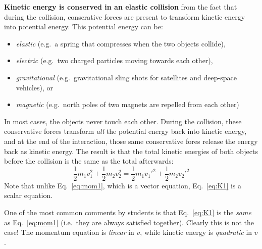 \textbf{Kinetic energy is conserved in an elastic collision} from the fact that
during the collision, conserative forces are present to transform kinetic
energy into  potential energy. This potential energy can be:
\begin{itemize}[itemsep=6pt]
\item\emph{elastic} (e.g.\ a spring that compresses when the two objects
  collide),
\item\emph{electric} (e.g.\ two charged particles moving towards each other),
\item\emph{gravitational} (e.g.\ gravitational sling shots for satellites and
  deep-space vehicles), or
\item\emph{magnetic} (e.g.\ north poles of two magnets are repelled from each
  other)
\end{itemize}
In most cases, the objects never touch each other. During the collision, these
conservative forces transform \emph{all} the potential energy back into kinetic
energy, and at the end of the interaction, those same conservative fores
release the energy back as kinetic energy. The result is that the total kinetic
energies of both objects before the collision is the same as the total
afterwards:
\begin{equation}
  \frac12m_1v_1^2 + \frac12m_2v_2^2 = \frac12m_1v_1'^2+\frac12 m_2v_2'^2
  \label{eq:K1}
\end{equation}
Note that unlike Eq.~\ref{eq:mom1}, which is a vector equation, Eq.~\ref{eq:K1}
is a scalar equation.
\begin{remark}
  One of the most common comments by students is that Eq.~\ref{eq:K1} is the
  \emph{same} as Eq.~\ref{eq:mom1} (i.e.\ they are always satisfied together).
  Clearly this is not the case! The momentum equation is \emph{linear} in $v$,
  while kinetic energy is \emph{quadratic} in $v$.
\end{remark}

